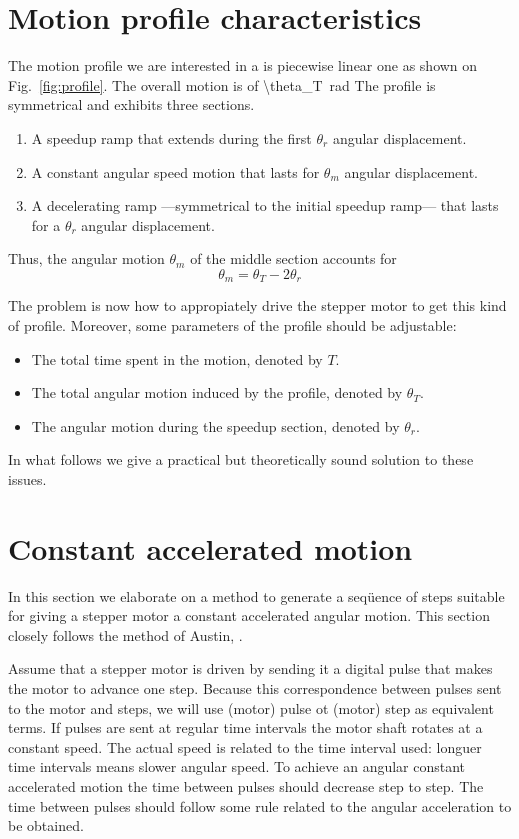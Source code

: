 \documentclass[a4paper]{article}
\newcommand{\vSI}[2]{\SI[math-rm=\ensuremath,parse-numbers=false]{#1}{#2}}
\begin{document}
\section{Motion profile characteristics}
\label{sec:basic-prof-char}

The motion profile we are interested in a is piecewise linear one as
shown on Fig.~\ref{fig:profile}. The overall motion is of
\vSI{\theta_T}{\radian} The profile is symmetrical and exhibits three
sections.
\begin{enumerate}
\item A speedup ramp that extends during the first $\theta_r$ angular
  displacement.
\item A constant angular speed motion that lasts for $\theta_m$
  angular displacement.
\item A decelerating ramp ---symmetrical to the initial speedup
  ramp--- that lasts for a $\theta_r$ angular displacement.
\end{enumerate}
Thus, the angular motion $\theta_m$ of the middle section accounts for
\begin{equation}
  \label{eq:2}
\theta_m=\theta_T-2\theta_r
\end{equation}


The problem is now how to appropiately drive the stepper motor to get
this kind of profile. Moreover, some parameters of the profile should
be adjustable:
\begin{itemize}
\item The total time spent in the motion, denoted by $T$.
\item The total angular motion induced by the profile, denoted by
  $\theta_T$.
\item The angular motion during the speedup section, denoted by $\theta_r$.
\end{itemize}
In what follows we give a practical but theoretically sound solution
to these issues.


\section{Constant accelerated motion}
\label{sec:const-accel-moti}

In this section we elaborate on a method to generate a seqüence of
steps suitable for giving a stepper motor a constant accelerated
angular motion. This section closely follows the method of Austin,
\cite{austin05:_gener}.

Assume that a stepper motor is driven by sending it a digital pulse
that makes the motor to advance one step. Because this correspondence
between pulses sent to the motor and steps, we will use (motor) pulse ot
(motor) step as equivalent terms. If pulses are sent at regular time
intervals the motor shaft rotates at a constant speed. The actual
speed is related to the time interval used: longuer time intervals
means slower angular speed.
%
To achieve an angular constant accelerated motion the time between
pulses should decrease step to step. The time between pulses should
follow some rule related to the angular acceleration to be obtained.
\end{document}
